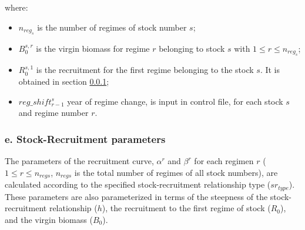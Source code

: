 \documentclass{article}
\begin{document}
where: 
\begin{itemize}
    
    \item $n_{reg_s}$ is the number of regimes of stock number $s$;
    
    
    \item $B^{s,r}_0$ is the virgin biomass for regime $r$ belonging to stock $s$ with $1\leq r \leq n_{reg_s}$;
    
    \item $R_0^{s,1}$ is the recruitment for the first regime belonging to the stock $s$. It is obtained in section \ref{ch: s-r};
    
    \item $reg\_shift^s_{r-1}$ year of regime change, is input in control file, for each stock $s$ and regime number $r$.
    
\end{itemize}

\hfill

\subsubsection{e. Stock-Recruitment parameters} \label{ch: s-r}

The parameters of the recruitment curve, $\alpha^r$ and $\beta^r$ for each regimen $r$ ($1\leq r \leq n_{regs}$, $n_{regs}$ is the total number of regimes of all stock numbers), are calculated according to the specified stock-recruitment relationship type ($sr_{type}$). These parameters are also parameterized in terms of the steepness of the stock-recruitment relationship ($h$), the recruitment to the first regime of stock ($R_0$), and the virgin biomass ($B_0$).\\
\end{document}
